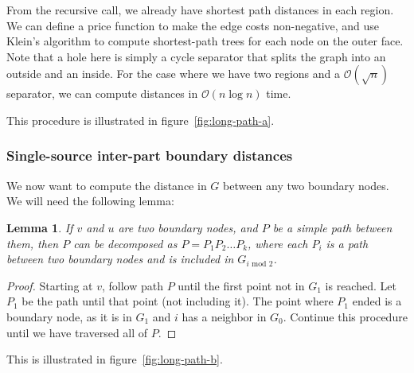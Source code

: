 \documentclass[11pt]{article}
\newtheorem{lemma}[theorem]{Lemma}
\begin{document}
From the recursive call, we already have shortest path distances in each region. We can define a price function to make the edge costs non-negative, and use Klein's algorithm to compute shortest-path trees for each node on the outer face. Note that a hole here is simply a cycle separator that splits the graph into an outside and an inside. For the case where we have two regions and a $\mathcal{O}(\sqrt{n})$ separator, we can compute distances in $\mathcal{O}(n\log n)$ time. 

This procedure is illustrated in figure~\ref{fig:long-path-a}.

\subsubsection{Single-source inter-part boundary distances}

We now want to compute the distance in $G$ between any two boundary nodes. We will need the following lemma:\\

\begin{lemma}
If $v$ and $u$ are two boundary nodes, and $P$ be a simple path between them, then $P$ can be decomposed as $P=P_1P_2\ldots P_k$, where each $P_i$ is a path between two boundary nodes and is included in $G_{i \text{ mod } 2}$.
\end{lemma}

\begin{proof}
Starting at $v$, follow path $P$ until the first point not in $G_1$ is reached. Let $P_1$ be the path until that point (not including it). The point where $P_1$ ended is a boundary node, as it is in $G_1$ and $i$ has a neighbor in $G_0$. Continue this procedure until we have traversed all of $P$.
\end{proof}

This is illustrated in figure~\ref{fig:long-path-b}.
\end{document}
